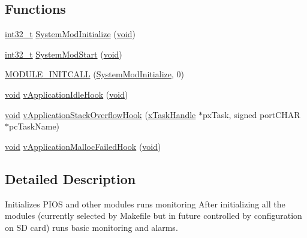 \subsection*{Functions}
\begin{DoxyCompactItemize}
\item 
\hyperlink{group___n_a_m_e_gafd12020da5a235dfcf0c3c748fb5baed}{int32\-\_\-t} \hyperlink{group___system_module_ga25e6d9910d77be50c3b01c7b738094d9}{System\-Mod\-Initialize} (\hyperlink{group___n_a_m_e_ga18028b8badbf1ea7e704ccac3c488e82}{void})
\item 
\hyperlink{group___n_a_m_e_gafd12020da5a235dfcf0c3c748fb5baed}{int32\-\_\-t} \hyperlink{group___system_module_gacce857283e17c1584c0944c872f40fce}{System\-Mod\-Start} (\hyperlink{group___n_a_m_e_ga18028b8badbf1ea7e704ccac3c488e82}{void})
\item 
\hyperlink{group___system_module_ga93b1d8678b35f3082f71ac804eca1619}{M\-O\-D\-U\-L\-E\-\_\-\-I\-N\-I\-T\-C\-A\-L\-L} (\hyperlink{group___system_module_ga25e6d9910d77be50c3b01c7b738094d9}{System\-Mod\-Initialize}, 0)
\item 
\hyperlink{group___n_a_m_e_ga18028b8badbf1ea7e704ccac3c488e82}{void} \hyperlink{group___system_module_ga97fd430f36f8b065226e2bff9bad1de5}{v\-Application\-Idle\-Hook} (\hyperlink{group___n_a_m_e_ga18028b8badbf1ea7e704ccac3c488e82}{void})
\item 
\hyperlink{group___n_a_m_e_ga18028b8badbf1ea7e704ccac3c488e82}{void} \hyperlink{group___system_module_ga329de0f973fabef8b34da6444654295c}{v\-Application\-Stack\-Overflow\-Hook} (\hyperlink{_common_2_libraries_2_free_r_t_o_s_2_source_2include_2task_8h_a271ae40d5db07d928a113766505a0965}{x\-Task\-Handle} $\ast$px\-Task, signed port\-C\-H\-A\-R $\ast$pc\-Task\-Name)
\item 
\hyperlink{group___n_a_m_e_ga18028b8badbf1ea7e704ccac3c488e82}{void} \hyperlink{group___system_module_gab7e5c95cf72a3f819bc4462a7fb62ca3}{v\-Application\-Malloc\-Failed\-Hook} (\hyperlink{group___n_a_m_e_ga18028b8badbf1ea7e704ccac3c488e82}{void})
\end{DoxyCompactItemize}


\subsection{Detailed Description}
Initializes P\-I\-O\-S and other modules runs monitoring After initializing all the modules (currently selected by Makefile but in future controlled by configuration on S\-D card) runs basic monitoring and alarms. 

